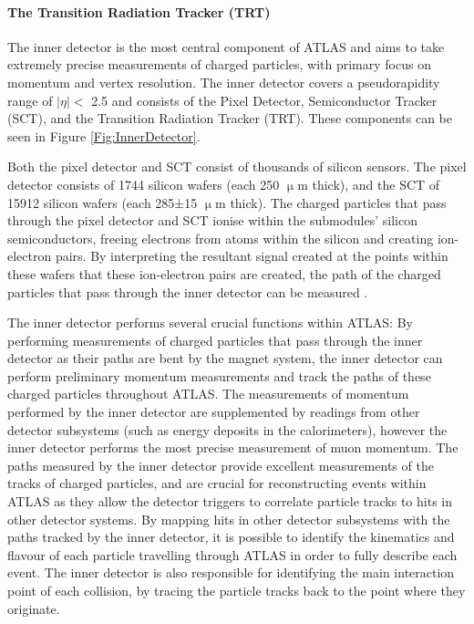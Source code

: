 \documentclass[12pt,a4paper,epsf,portrait,times,epsfig]{article}
\begin{document}
		\paragraph{The Transition Radiation Tracker (TRT)}\label{Section:TRT}

		The inner detector is the most central component of ATLAS and aims to take extremely precise measurements of charged particles, with primary focus on momentum and vertex resolution. The inner detector covers a pseudorapidity range of $|\eta| <$ 2.5 and consists of the Pixel Detector, Semiconductor Tracker (SCT), and the Transition Radiation Tracker (TRT). These components can be seen in Figure \ref{Fig:InnerDetector}. \par
		
		Both the pixel detector and SCT consist of thousands of silicon sensors. The pixel detector consists of 1744 silicon wafers (each 250 $\upmu$m thick), and the SCT of 15912 silicon wafers (each 285±15 $\upmu$m thick). The charged particles that pass through the pixel detector and SCT ionise within the submodules’ silicon semiconductors, freeing electrons from atoms within the silicon and creating ion-electron pairs. By interpreting the resultant signal created at the points within these wafers that these ion-electron pairs are created, the path of the charged particles that pass through the inner detector can be measured 
		\cite{ATLAS-TDR-01, ATLAS-TDR-02, Article:ATLASDesignPaper}.
		\par
		
		

		
		
		 The inner detector performs several crucial functions within ATLAS: By performing measurements of charged particles that pass through the inner detector as their paths are bent by the magnet system, the inner detector can perform preliminary momentum measurements and track the paths of these charged particles throughout ATLAS. The measurements of momentum performed by the inner detector are supplemented by readings from other detector subsystems (such as energy deposits in the calorimeters), however the inner detector performs the most precise measurement of muon momentum. The paths measured by the inner detector provide excellent measurements of the tracks of charged particles, and are crucial for reconstructing events within ATLAS as they allow the detector triggers to correlate particle tracks to hits in other detector systems. By mapping hits in other detector subsystems with the paths tracked by the inner detector, it is possible to identify the kinematics and flavour of each particle travelling through ATLAS in order to fully describe each event. The inner detector is also responsible	for identifying the main interaction point of each collision, by tracing the particle tracks back to the point where they originate. \par
		
\end{document}
